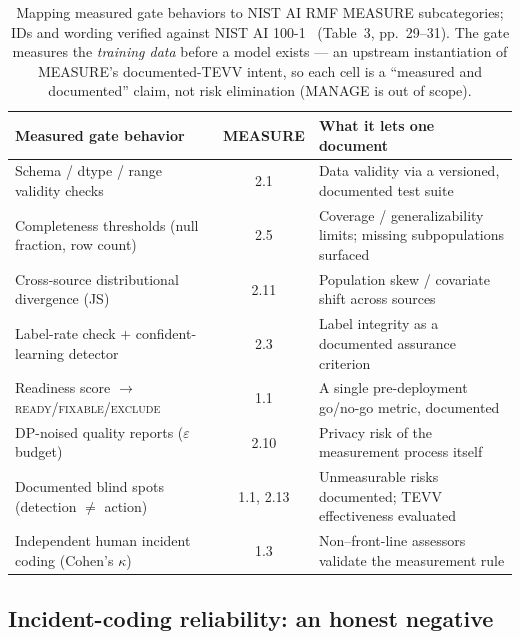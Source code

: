 \documentclass[11pt]{article}
\begin{document}
\begin{table}[t]
\centering
\caption{Mapping measured gate behaviors to NIST AI RMF MEASURE subcategories;
IDs and wording verified against NIST AI 100-1~\citep{nistairmf2023} (Table~3,
pp.~29--31). The gate measures the \emph{training data} before a model exists ---
an upstream instantiation of MEASURE's documented-TEVV intent, so each cell is a
``measured and documented'' claim, not risk elimination (MANAGE is out of scope).}
\label{tab:measure}
\small
\begin{tabular}{p{}cp{}}
\toprule
Measured gate behavior & MEASURE & What it lets one document \\
\midrule
Schema / dtype / range validity checks & 2.1 & Data validity via a versioned, documented test suite \\
Completeness thresholds (null fraction, row count) & 2.5 & Coverage / generalizability limits; missing subpopulations surfaced \\
Cross-source distributional divergence (JS) & 2.11 & Population skew / covariate shift across sources \\
Label-rate check $+$ confident-learning detector & 2.3 & Label integrity as a documented assurance criterion \\
Readiness score $\rightarrow$ \textsc{ready}/\textsc{fixable}/\textsc{exclude} & 1.1 & A single pre-deployment go/no-go metric, documented \\
DP-noised quality reports ($\varepsilon$ budget) & 2.10 & Privacy risk of the measurement process itself \\
Documented blind spots (detection $\neq$ action) & 1.1, 2.13 & Unmeasurable risks documented; TEVV effectiveness evaluated \\
Independent human incident coding (Cohen's $\kappa$) & 1.3 & Non--front-line assessors validate the measurement rule \\
\bottomrule
\end{tabular}
\end{table}

\subsection{Incident-coding reliability: an honest negative}
\end{document}
